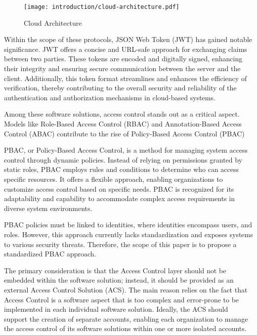 \begin{figure*}[htbp]
    \centering
    \texttt{[image: introduction/cloud-architecture.pdf]}
    \caption{Cloud Architecture}
    \label{fig:cloud-architecture}
\end{figure*}

Within the scope of these protocols, JSON Web Token (JWT) \cite{c6} has gained notable significance. JWT offers a concise and URL-safe approach for exchanging claims between two parties.
These tokens are encoded and digitally signed, enhancing their integrity and ensuring secure communication between the server and the client.
Additionally, this token format streamlines and enhances the efficiency of verification, thereby contributing to the overall security and reliability of the authentication and authorization mechanisms in cloud-based systems.

Among these software solutions, access control stands out as a critical aspect. Models like Role-Based Access Control (RBAC) and Annotation-Based Access Control (ABAC) contribute to the rise of Policy-Based Access Control (PBAC) \cite{c7}

PBAC, or Policy-Based Access Control, is a method for managing system access control through dynamic policies. Instead of relying on permissions granted by static roles, PBAC employs rules and conditions to determine who can access specific resources. 
It offers a flexible approach, enabling organizations to customize access control based on specific needs. PBAC is recognized for its adaptability and capability to accommodate complex access requirements in diverse system environments.

PBAC policies must be linked to identities, where identities encompass users, and roles. However, this approach currently lacks standardization and exposes systems to various security threats.
Therefore, the scope of this paper is to propose a standardized PBAC approach.

The primary consideration is that the Access Control layer should not be embedded within the software solution; instead, it should be provided as an external Access Control Solution (ACS). 
The main reason relies on the fact that Access Control is a software aspect that is too complex and error-prone to be implemented in each individual software solution.
Ideally, the ACS should support the creation of separate accounts, enabling each organization to manage the access control of its software solutions within one or more isolated accounts.

